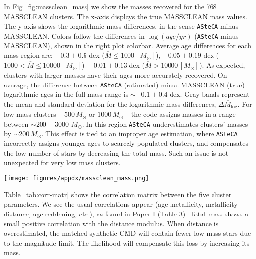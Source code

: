 \documentclass[draft]{aa}
\begin{document}
\begin{appendix}
In Fig~\ref{fig:massclean_mass} we show the masses recovered for the 768
MASSCLEAN clusters. The x-axis displays the true MASSCLEAN mass
values. The y-axis shows the logarithmic mass differences, in the sense \texttt
{ASteCA} minus MASSCLEAN.\@
%
Colors follow the differences in $\log(age/yr)$ (\texttt{ASteCA} minus
MASSCLEAN), shown in the right plot colorbar.
Average age differences for each mass region are: 
$-0.3{\pm}0.6$ dex ($\overline{M}{\le}1000\,[M_{\odot}]$),
$-0.05{\pm}0.19$ dex ($1000{<}\overline{M}{\le}10000\,[M_{\odot}]$),
$-0.01{\pm}0.13$ dex ($\overline{M}{>}10000\,[M_{\odot}]$).
As expected, clusters with larger masses have their ages more accurately
recovered. On average, the difference between \texttt{ASteCA} (estimated) minus
MASSCLEAN (true) logarithmic ages in the full mass range is ${\sim}-0.1{\pm}0.4$
dex.
%
Gray bands represent the mean and standard deviation for the logarithmic
mass differences, $\overline{\Delta M_{\log}}$.
%
For low mass clusters -- $500\,M_{\odot}$ or $1000\,M_{\odot}$ -- the
code assigns masses in a range between ${\sim}200{-}3000$ $M_{\odot}$.
In this region \texttt{ASteCA} underestimates clusters' masses by
${\sim}200\,M_{\odot}$. This effect is tied to an improper age estimation, where
\texttt{ASteCA} incorrectly assigns younger ages to scarcely populated clusters,
and compensates the low number of stars by decreasing the total mass. Such an
issue is not unexpected for very low mass clusters.

\begin{figure*}
\texttt{[image: figures/appdx/massclean\_mass.png]}
\caption{Recovered masses by \texttt{ASteCA} for the 768 MASSCLEAN clusters.
Logarithmic mass differences $\Delta M_{\log}$ are obtained in the sense
\texttt{ASteCA} minus MASSCLEAN, and shown in the y-axis. MASSCLEAN masses in
the x-axis are perturbed with a small random scatter.}
\label{fig:massclean_mass}
\end{figure*}

Table~\ref{tab:corr-matr} shows the correlation matrix between the five cluster
parameters. We see the usual correlations appear (age-metallicity,
metallicity-distance, age-reddening, etc.), as found in Paper I (Table 3).
Total mass shows a small positive correlation with the distance modulus.
When distance is overestimated, the matched synthetic CMD will contain fewer low
mass stars due to the magnitude limit. The likelihood will compensate this loss
by increasing its mass.


\end{appendix}
\end{document}
